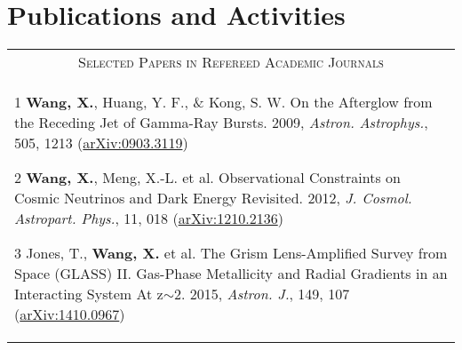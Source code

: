 \documentclass[letterpaper,10pt]{article}
\begin{document}
\section{Publications and Activities}
\begin{longtable}{p{6in}}
\multicolumn{1}{c}{\textsc{Selected Papers in Refereed Academic Journals}}      \\
\vspace{-0.3cm}
\begin{list}{}{\leftmargin=0.5em}
    \item[1]\hypertarget{09.wang.aa}{} \textbf{Wang, X.}, Huang, Y. F., \& Kong, S. W. On the Afterglow from the Receding Jet of Gamma-Ray Bursts. 2009, \textit{Astron. Astrophys.}, 505, 1213 (\href{http://arxiv.org/abs/0903.3119}{arXiv:0903.3119})
    \item[2]\hypertarget{12.wang.jcap}{} \textbf{Wang, X.}, Meng, X.-L. et al. Observational Constraints on Cosmic Neutrinos and Dark Energy Revisited. 2012, \textit{J. Cosmol. Astropart. Phys.}, 11, 018 (\href{http://arxiv.org/abs/1210.2136}{arXiv:1210.2136})
    \item[3]\hypertarget{15.jones.aj}{} Jones, T., \textbf{Wang, X.} et al. The Grism Lens-Amplified Survey from Space (GLASS) II.
        Gas-Phase Metallicity and Radial Gradients in an Interacting System At z$\sim$2. 2015, \textit{Astron. J.}, 149, 107
        (\href{http://arxiv.org/abs/1410.0967}{arXiv:1410.0967})

\end{list}
\end{longtable}
\end{document}

